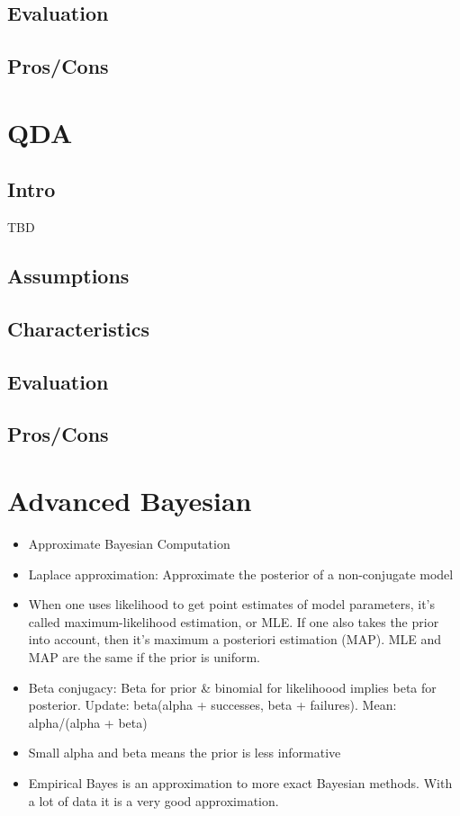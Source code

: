 \documentclass[]{book}
\theoremstyle{definition}
\theoremstyle{definition}
\theoremstyle{definition}
\theoremstyle{remark}
\begin{document}
\subsection{Evaluation}\label{evaluation-1}

\subsection{Pros/Cons}\label{proscons-1}

\section{QDA}\label{qda}

\subsection{Intro}\label{intro-2}

TBD

\subsection{Assumptions}\label{assumptions-2}

\subsection{Characteristics}\label{characteristics-2}

\subsection{Evaluation}\label{evaluation-2}

\subsection{Pros/Cons}\label{proscons-2}

\section{Advanced Bayesian}\label{advanced-bayesian}

\begin{itemize}
\item
  Approximate Bayesian Computation
\item
  Laplace approximation: Approximate the posterior of a non-conjugate
  model
\item
  When one uses likelihood to get point estimates of model parameters,
  it's called maximum-likelihood estimation, or MLE. If one also takes
  the prior into account, then it's maximum a posteriori estimation
  (MAP). MLE and MAP are the same if the prior is uniform.
\item
  Beta conjugacy: Beta for prior \& binomial for likelihoood implies
  beta for posterior. Update: beta(alpha + successes, beta + failures).
  Mean: alpha/(alpha + beta)
\item
  Small alpha and beta means the prior is less informative
\item
  Empirical Bayes is an approximation to more exact Bayesian methods.
  With a lot of data it is a very good approximation.
\end{itemize}
\end{document}
